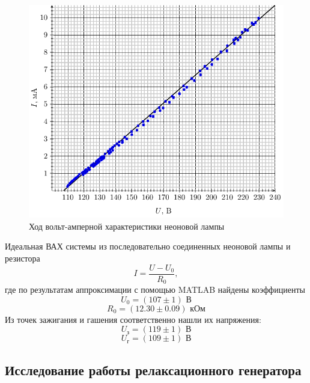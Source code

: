 

\newpage


\begin{figure}[H]
	\centering
	\includegraphics[width=\textwidth]{vax}
	\caption{Ход вольт-амперной характеристики неоновой лампы}
	\label{fig:figure1}
\end{figure}

Идеальная ВАХ системы из последовательно соединенных неоновой лампы и резистора
\begin{equation}
	I=\frac{U-U_0}{R_0},
\end{equation}
где по результатам аппроксимации с помощью MATLAB найдены коэффициенты 
\begin{equation}
	U_0=(107\pm1) \text{ В}
\end{equation}
\begin{equation}
	R_0=(12.30\pm0.09) \text{ кОм}
\end{equation}
Из точек зажигания и гашения соответственно нашли их напряжения:
\begin{equation}
	U_\text{з}=(119\pm1) \text{ В}
\end{equation}
\begin{equation}
	U_\text{г}=(109\pm1) \text{ В}
\end{equation}

\newpage
\subsection{Исследование работы релаксационного генератора}
